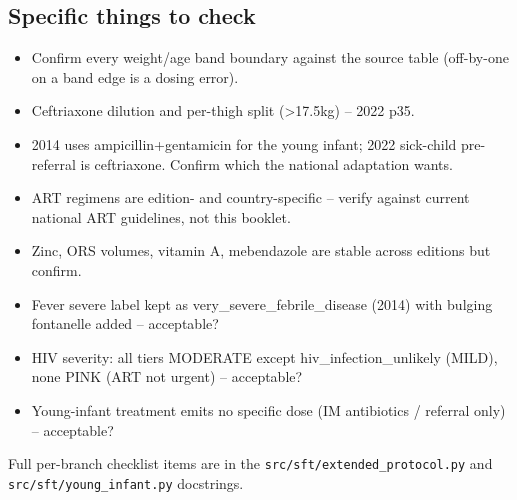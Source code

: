 \documentclass[10pt,a4paper]{article}
\begin{document}
\begin{Form}
\section*{Specific things to check}
\begin{itemize}[leftmargin=2.4em,itemsep=5pt,label={}]
\item \CheckBox[name=ok_chk_93,width=1.6ex,height=1.6ex]{}\hspace{0.4em}\footnotesize Confirm every weight/age band boundary against the source table (off-by-one on a band edge is a dosing error).
\item \CheckBox[name=ok_chk_94,width=1.6ex,height=1.6ex]{}\hspace{0.4em}\footnotesize Ceftriaxone dilution and per-thigh split (>17.5kg) -- 2022 p35.
\item \CheckBox[name=ok_chk_95,width=1.6ex,height=1.6ex]{}\hspace{0.4em}\footnotesize 2014 uses ampicillin+gentamicin for the young infant; 2022 sick-child pre-referral is ceftriaxone. Confirm which the national adaptation wants.
\item \CheckBox[name=ok_chk_96,width=1.6ex,height=1.6ex]{}\hspace{0.4em}\footnotesize ART regimens are edition- and country-specific -- verify against current national ART guidelines, not this booklet.
\item \CheckBox[name=ok_chk_97,width=1.6ex,height=1.6ex]{}\hspace{0.4em}\footnotesize Zinc, ORS volumes, vitamin A, mebendazole are stable across editions but confirm.
\item \CheckBox[name=ok_chk_98,width=1.6ex,height=1.6ex]{}\hspace{0.4em}\footnotesize Fever severe label kept as very\_severe\_febrile\_disease (2014) with bulging fontanelle added -- acceptable?
\item \CheckBox[name=ok_chk_99,width=1.6ex,height=1.6ex]{}\hspace{0.4em}\footnotesize HIV severity: all tiers MODERATE except hiv\_infection\_unlikely (MILD), none PINK (ART not urgent) -- acceptable?
\item \CheckBox[name=ok_chk_100,width=1.6ex,height=1.6ex]{}\hspace{0.4em}\footnotesize Young-infant treatment emits no specific dose (IM antibiotics / referral only) -- acceptable?
\end{itemize}
{\footnotesize Full per-branch checklist items are in the \texttt{src/sft/extended\_protocol.py} and \texttt{src/sft/young\_infant.py} docstrings.}\\[10pt]

\end{Form}
\end{document}
